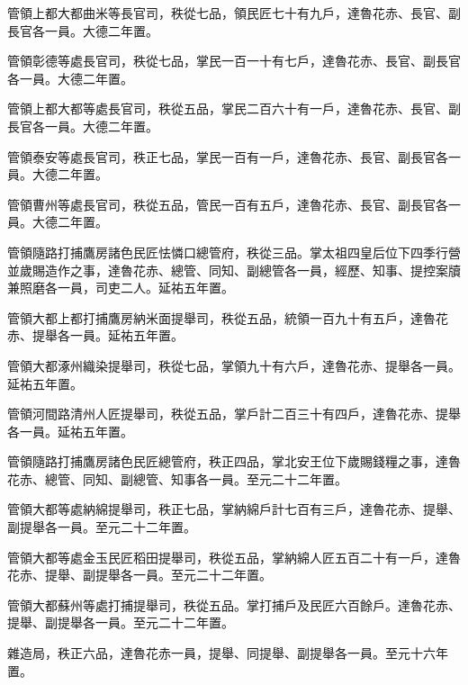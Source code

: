 \begin{pinyinscope}
 管領上都大都曲米等長官司，秩從七品，領民匠七十有九戶，達魯花赤、長官、副長官各一員。大德二年置。



 管領彰德等處長官司，秩從七品，掌民一百一十有七戶，達魯花赤、長官、副長官各一員。大德二年置。



 管領上都大都等處長官司，秩從五品，掌民二百六十有一戶，達魯花赤、長官、副長官各一員。大德二年置。



 管領泰安等處長官司，秩正七品，掌民一百有一戶，達魯花赤、長官、副長官各一員。大德二年置。



 管領曹州等處長官司，秩從五品，管民一百有五戶，達魯花赤、長官、副長官各一員。大德二年置。



 管領隨路打捕鷹房諸色民匠怯憐口總管府，秩從三品。掌太祖四皇后位下四季行營並歲賜造作之事，達魯花赤、總管、同知、副總管各一員，經歷、知事、提控案牘兼照磨各一員，司吏二人。延祐五年置。



 管領大都上都打捕鷹房納米面提舉司，秩從五品，統領一百九十有五戶，達魯花赤、提舉各一員。延祐五年置。



 管領大都涿州織染提舉司，秩從七品，掌領九十有六戶，達魯花赤、提舉各一員。延祐五年置。



 管領河間路清州人匠提舉司，秩從五品，掌戶計二百三十有四戶，達魯花赤、提舉各一員。延祐五年置。



 管領隨路打捕鷹房諸色民匠總管府，秩正四品，掌北安王位下歲賜錢糧之事，達魯花赤、總管、同知、副總管、知事各一員。至元二十二年置。



 管領大都等處納綿提舉司，秩正七品，掌納綿戶計七百有三戶，達魯花赤、提舉、副提舉各一員。至元二十二年置。



 管領大都等處金玉民匠稻田提舉司，秩從五品，掌納綿人匠五百二十有一戶，達魯花赤、提舉、副提舉各一員。至元二十二年置。



 管領大都蘇州等處打捕提舉司，秩從五品。掌打捕戶及民匠六百餘戶。達魯花赤、提舉、副提舉各一員。至元二十二年置。



 雜造局，秩正六品，達魯花赤一員，提舉、同提舉、副提舉各一員。至元十六年置。




\end{pinyinscope}
